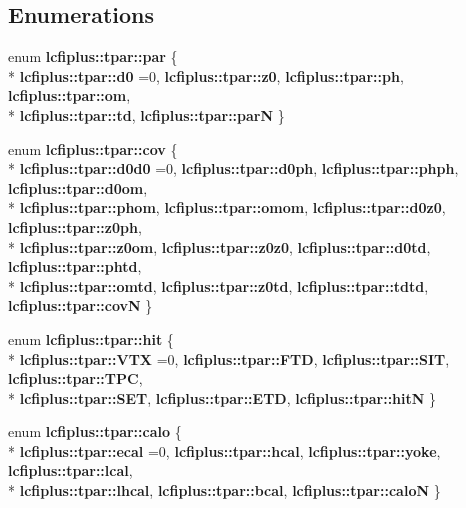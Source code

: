 \subsection*{Enumerations}
\begin{DoxyCompactItemize}
\item 
enum {\bf lcfiplus\-::tpar\-::par} \{ \\*
{\bf lcfiplus\-::tpar\-::d0} =0, 
{\bf lcfiplus\-::tpar\-::z0}, 
{\bf lcfiplus\-::tpar\-::ph}, 
{\bf lcfiplus\-::tpar\-::om}, 
\\*
{\bf lcfiplus\-::tpar\-::td}, 
{\bf lcfiplus\-::tpar\-::par\-N}
 \}
\item 
enum {\bf lcfiplus\-::tpar\-::cov} \{ \\*
{\bf lcfiplus\-::tpar\-::d0d0} =0, 
{\bf lcfiplus\-::tpar\-::d0ph}, 
{\bf lcfiplus\-::tpar\-::phph}, 
{\bf lcfiplus\-::tpar\-::d0om}, 
\\*
{\bf lcfiplus\-::tpar\-::phom}, 
{\bf lcfiplus\-::tpar\-::omom}, 
{\bf lcfiplus\-::tpar\-::d0z0}, 
{\bf lcfiplus\-::tpar\-::z0ph}, 
\\*
{\bf lcfiplus\-::tpar\-::z0om}, 
{\bf lcfiplus\-::tpar\-::z0z0}, 
{\bf lcfiplus\-::tpar\-::d0td}, 
{\bf lcfiplus\-::tpar\-::phtd}, 
\\*
{\bf lcfiplus\-::tpar\-::omtd}, 
{\bf lcfiplus\-::tpar\-::z0td}, 
{\bf lcfiplus\-::tpar\-::tdtd}, 
{\bf lcfiplus\-::tpar\-::cov\-N}
 \}
\item 
enum {\bf lcfiplus\-::tpar\-::hit} \{ \\*
{\bf lcfiplus\-::tpar\-::\-V\-T\-X} =0, 
{\bf lcfiplus\-::tpar\-::\-F\-T\-D}, 
{\bf lcfiplus\-::tpar\-::\-S\-I\-T}, 
{\bf lcfiplus\-::tpar\-::\-T\-P\-C}, 
\\*
{\bf lcfiplus\-::tpar\-::\-S\-E\-T}, 
{\bf lcfiplus\-::tpar\-::\-E\-T\-D}, 
{\bf lcfiplus\-::tpar\-::hit\-N}
 \}
\item 
enum {\bf lcfiplus\-::tpar\-::calo} \{ \\*
{\bf lcfiplus\-::tpar\-::ecal} =0, 
{\bf lcfiplus\-::tpar\-::hcal}, 
{\bf lcfiplus\-::tpar\-::yoke}, 
{\bf lcfiplus\-::tpar\-::lcal}, 
\\*
{\bf lcfiplus\-::tpar\-::lhcal}, 
{\bf lcfiplus\-::tpar\-::bcal}, 
{\bf lcfiplus\-::tpar\-::calo\-N}
 \}
\end{DoxyCompactItemize}

